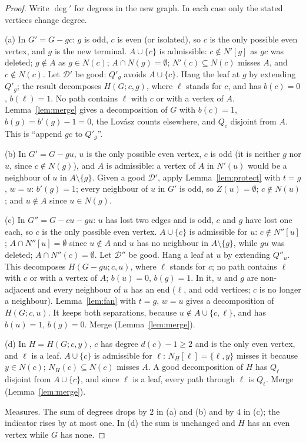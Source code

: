 \documentclass[11pt]{amsart}
\theoremstyle{definition}
\newcommand{\cD}{\mathcal D}
\begin{document}
\begin{proof}
Write $\deg'$ for degrees in the new graph. In each case only the stated vertices change degree.

(a) In $G'=G-gc$: $g$ is odd, $c$ is even (or isolated), so $c$ is the only possible even vertex,
and $g$ is the new terminal. $A\cup\{c\}$ is admissible: $c\notin N'[g]$ as $gc$ was deleted;
$g\notin A$ as $g\in N(c)$; $A\cap N(g)=\emptyset$; $N'(c)\subseteq N(c)$ misses $A$, and
$c\notin N(c)$. Let $\cD'$ be good: $Q'_g$ avoids $A\cup\{c\}$. Hang the leaf at $g$ by extending
$Q'_g$; the result decomposes $H(G;c,g)$, where $\ell$ stands for $c$, and has $b(c)=0$, $b(\ell)=1$.
No path contains $\ell$ with $c$ or with a vertex of $A$. Lemma~\ref{lem:merge} gives a decomposition
of $G$ with $b(c)=1$, $b(g)=b'(g)-1=0$, the Lov\'asz counts elsewhere, and $Q_c$ disjoint from $A$.
This is ``append $gc$ to $Q'_g$''.

(b) In $G'=G-gu$, $u$ is the only possible even vertex, $c$ is odd (it is neither $g$ nor $u$, since
$c\notin N(g)$), and $A$ is admissible: a vertex of
$A$ in $N'(u)$ would be a neighbour of $u$ in $A\setminus\{g\}$. Given a good $\cD'$, apply
Lemma~\ref{lem:protect} with $t=g$, $w=u$: $b'(g)=1$; every neighbour of $u$ in $G'$ is odd, so
$Z(u)=\emptyset$; $c\notin N(u)$; and $u\notin A$ since $u\in N(g)$.

(c) In $G''=G-cu-gu$: $u$ has lost two edges and is odd, $c$ and $g$ have lost one each, so $c$ is
the only possible even vertex. $A\cup\{c\}$ is admissible for $u$: $c\notin N''[u]$;
$A\cap N''[u]=\emptyset$ since $u\notin A$ and $u$ has no neighbour in $A\setminus\{g\}$, while
$gu$ was deleted; $A\cap N''(c)=\emptyset$. Let $\cD''$ be good. Hang a leaf at $u$ by extending
$Q''_u$. This decomposes $H(G-gu;c,u)$, where $\ell$ stands for $c$; no path contains $\ell$ with $c$
or with a vertex of $A$; $b(u)=0$, $b(g)=1$. In it, $u$ and $g$ are non-adjacent and every neighbour
of $u$ has an end ($\ell$, and odd vertices; $c$ is no longer a neighbour). Lemma~\ref{lem:fan} with
$t=g$, $w=u$ gives a decomposition of $H(G;c,u)$. It keeps both separations, because $u\notin
A\cup\{c,\ell\}$, and has $b(u)=1$, $b(g)=0$. Merge (Lemma~\ref{lem:merge}).

(d) In $H=H(G;c,y)$, $c$ has degree $d(c)-1\ge2$ and is the only even vertex, and $\ell$ is a
leaf. $A\cup\{c\}$ is admissible for $\ell$: $N_H[\ell]=\{\ell,y\}$ misses it because $y\in N(c)$;
$N_H(c)\subseteq N(c)$ misses $A$. A good decomposition of $H$ has $Q_\ell$ disjoint from $A\cup\{c\}$,
and since $\ell$ is a leaf, every path through $\ell$ is $Q_\ell$. Merge (Lemma~\ref{lem:merge}).

Measures. The sum of degrees drops by $2$ in (a) and (b) and by $4$ in (c); the indicator rises by at
most one. In (d) the sum is unchanged and $H$ has an even vertex while $G$ has none.
\end{proof}
\end{document}
